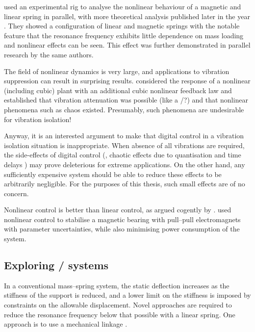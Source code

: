 \textcite{bonisoli2007-mssp} used an experimental rig to analyse the nonlinear behaviour of a magnetic and linear spring in parallel, with more theoretical analysis published later in the year \cite{bonisoli2007-mrc}.
They showed a configuration of linear and magnetic springs with the notable feature that the resonance frequency exhibits little dependence on mass loading and nonlinear effects can be seen.
This effect was further demonstrated in parallel research by the same authors.

The field of nonlinear dynamics is very large, and applications to vibration suppression can result in surprising results.
\textcite{oueini1999} considered the response of a nonlinear (including cubic) plant with an additional cubic nonlinear feedback law and established that vibration attenuation was possible (like a \vibneut/?) and that nonlinear phenomena such as chaos existed.
Presumably, such phenomena are undesirable for vibration isolation!

Anyway, it is an interested argument to make that digital control in a vibration isolation situation is inappropriate.
When absence of all vibrations are required, the side-effects of digital control (\ie, chaotic effects due to quantisation and time delays \cite{csernak2007}) may prove deleterious for extreme applications.
On the other hand, any sufficiently expensive system should be able to reduce these effects to be arbitrarily negligible.
For the purposes of this thesis, such small effects are of no concern.

Nonlinear control is better than linear control, as argued cogently by \textcite{kokotovic1992}.
\textcite{queiroz2007} used nonlinear control to stabilise a magnetic bearing with pull--pull electromagnets with parameter uncertainties, while also minimising power consumption of the system.



\subsection{Exploring \qzs/ systems}

In a conventional mass--spring system, the static deflection increases as the stiffness of the support is reduced, and a lower limit on the stiffness is imposed by constraints on the allowable displacement.
Novel approaches are required to reduce the resonance frequency below that possible with a linear spring.
One approach is to use a mechanical linkage \cite{winterflood2001}.

